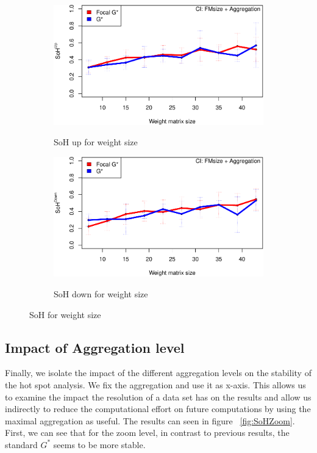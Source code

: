 \documentclass{itatnew}
\begin{document}
\begin{figure}[htp]
  \begin{subfigure}{\linewidth}
    \caption{SoH up for weight size}
    \includegraphics[width=\linewidth]{images/gen-weight-1}
    \label{fig:wUp}
  \end{subfigure}
  \hspace{1em}
  \begin{subfigure}{\linewidth}
    \caption{SoH down for weight size}
    \includegraphics[width=\linewidth]{images/gen-weight-2}
    \label{fig:wDown}
  \end{subfigure}
  \caption{SoH for weight size}
  \label{fig:SoHWeight}
\end{figure}
%
%
\subsection{Impact of Aggregation level}
Finally, we isolate the impact of the different aggregation levels on the stability of the hot spot analysis. 
We fix the aggregation and use it as x-axis. This allows us to examine the impact
the resolution of a data set has on the results and allow us indirectly to reduce the 
computational effort on future computations by using the maximal aggregation as useful.
The results can seen in figure ~\ref{fig:SoHZoom}.
First, we can see that for the zoom level, in contrast to previous results, the standard $G^*$ seems to be more stable.
\end{document}

